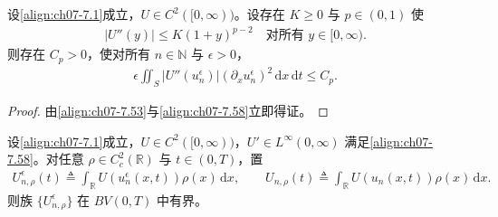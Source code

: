 \documentclass[../../main.tex]{subfiles}%
\begin{document}
\begin{lemma}\label{lemma:ch07-7.4.3}
设\eqref{align:ch07-7.1}成立，$U\in C^2([0,\infty))$。设存在 $K\geqslant0$ 与 $p\in(0,1)$ 使
\begin{align}
|U''(y)|\leqslant K(1+y)^{p-2}\quad\text{对所有 }y\in[0,\infty). \label{align:ch07-7.58}
\end{align}
则存在 $C_p>0$，使对所有 $n\in\mathbb{N}$ 与 $\epsilon>0$，
\begin{align}
\epsilon\iint_S|U''(u_n^\epsilon)|(\partial_x u_n^\epsilon)^2\,\mathrm{d}x\,\mathrm{d}t\leqslant C_p. \label{align:ch07-7.59}
\end{align}
\end{lemma}

\begin{proof}
由\eqref{align:ch07-7.53}与\eqref{align:ch07-7.58}立即得证。
\end{proof}

\begin{lemma}\label{lemma:ch07-7.4.4}
设\eqref{align:ch07-7.1}成立，$U\in C^2([0,\infty))$，$U'\in L^\infty(0,\infty)$ 满足\eqref{align:ch07-7.58}。对任意 $\rho\in C^2_c(\mathbb{R})$ 与 $t\in(0,T)$，置
\begin{align}
U_{n,\rho}^\epsilon(t)\triangleq \int_{\mathbb{R}}U(u_n^\epsilon(x,t))\rho(x)\,\mathrm{d}x,\qquad
U_{n,\rho}(t)\triangleq \int_{\mathbb{R}}U(u_n(x,t))\rho(x)\,\mathrm{d}x. \label{align:ch07-7.60}
\end{align}
则族 $\{U_{n,\rho}^\epsilon\}$ 在 $BV(0,T)$ 中有界。
\end{lemma}
\end{document}

